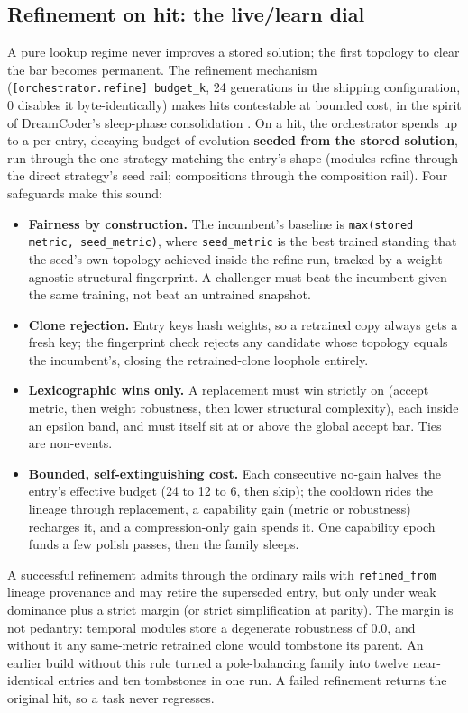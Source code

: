 \documentclass[11pt]{article}
\begin{document}
\subsection{Refinement on hit: the live/learn dial}

A pure lookup regime never improves a stored solution; the first topology to clear the bar becomes permanent. The refinement mechanism (\texttt{[orchestrator.refine] budget_k}, 24 generations in the shipping configuration, 0 disables it byte-identically) makes hits contestable at bounded cost, in the spirit of DreamCoder's sleep-phase consolidation \citep{ellis2021}. On a hit, the orchestrator spends up to a per-entry, decaying budget of evolution \textbf{seeded from the stored solution}, run through the one strategy matching the entry's shape (modules refine through the direct strategy's seed rail; compositions through the composition rail). Four safeguards make this sound:

\begin{itemize}[leftmargin=*]
\item \textbf{Fairness by construction.} The incumbent's baseline is \texttt{max(stored metric, seed_metric)}, where \texttt{seed_metric} is the best trained standing that the seed's own topology achieved inside the refine run, tracked by a weight-agnostic structural fingerprint. A challenger must beat the incumbent given the same training, not beat an untrained snapshot.
\item \textbf{Clone rejection.} Entry keys hash weights, so a retrained copy always gets a fresh key; the fingerprint check rejects any candidate whose topology equals the incumbent's, closing the retrained-clone loophole entirely.
\item \textbf{Lexicographic wins only.} A replacement must win strictly on (accept metric, then weight robustness, then lower structural complexity), each inside an epsilon band, and must itself sit at or above the global accept bar. Ties are non-events.
\item \textbf{Bounded, self-extinguishing cost.} Each consecutive no-gain halves the entry's effective budget (24 to 12 to 6, then skip); the cooldown rides the lineage through replacement, a capability gain (metric or robustness) recharges it, and a compression-only gain spends it. One capability epoch funds a few polish passes, then the family sleeps.
\end{itemize}

A successful refinement admits through the ordinary rails with \texttt{refined_from} lineage provenance and may retire the superseded entry, but only under weak dominance plus a strict margin (or strict simplification at parity). The margin is not pedantry: temporal modules store a degenerate robustness of 0.0, and without it any same-metric retrained clone would tombstone its parent. An earlier build without this rule turned a pole-balancing family into twelve near-identical entries and ten tombstones in one run. A failed refinement returns the original hit, so a task never regresses.
\end{document}
